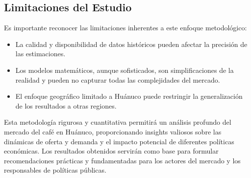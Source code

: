 \documentclass[12pt, a4paper]{article}
\begin{document}
\subsection{Limitaciones del Estudio}

Es importante reconocer las limitaciones inherentes a este enfoque metodológico:

\begin{itemize}
    \item La calidad y disponibilidad de datos históricos pueden afectar la precisión de las estimaciones.
    \item Los modelos matemáticos, aunque sofisticados, son simplificaciones de la realidad y pueden no capturar todas las complejidades del mercado.
    \item El enfoque geográfico limitado a Huánuco puede restringir la generalización de los resultados a otras regiones.
\end{itemize}

Esta metodología rigurosa y cuantitativa permitirá un análisis profundo del mercado del café en Huánuco, proporcionando insights valiosos sobre las dinámicas de oferta y demanda y el impacto potencial de diferentes políticas económicas. Los resultados obtenidos servirán como base para formular recomendaciones prácticas y fundamentadas para los actores del mercado y los responsables de políticas públicas.

\newpage
\printbibliography
 
\end{document}
